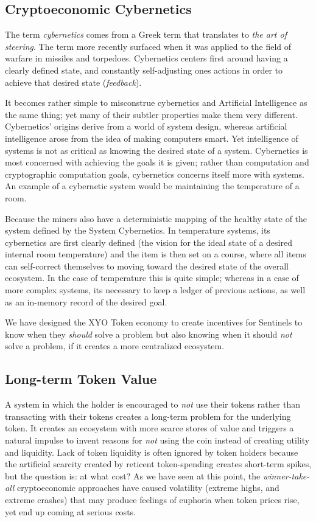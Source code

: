 \documentclass{article}
\begin{document}
\subsection{Cryptoeconomic Cybernetics}
The term \textit{cybernetics} comes from a Greek term that translates to \textit{the art of steering}. The term more recently surfaced when it was applied to the field of warfare in missiles and torpedoes. Cybernetics centers first around having a clearly defined {state}, and constantly self-adjusting ones actions in order to achieve that desired state (\textit{feedback}).

It becomes rather simple to misconstrue cybernetics and Artificial Intelligence as the same thing; yet many of their subtler properties make them very different. Cybernetics' origins derive from a world of system design, whereas artificial intelligence arose from the idea of making computers smart. Yet intelligence of systems is not as critical as knowing the desired state of a system. Cybernetics is most concerned with achieving the goals it is given; rather than computation and cryptographic computation goals, cybernetics concerns itself more with systems. An example of a cybernetic system would be maintaining the temperature of a room. 

Because the miners also have a deterministic mapping of the healthy state of the system defined by the System Cybernetics. In temperature systems, its cybernetics are first clearly defined (the vision for the ideal state of a desired internal room temperature) and the item is then set on a course, where all items can self-correct themselves to moving toward the desired state of the overall ecosystem. In the case of temperature this is quite simple; whereas in a case of more complex systems, its necessary to keep a ledger of previous actions, as well as an in-memory record of the desired goal. 

We have designed the XYO Token economy to create incentives for Sentinels to know when they \textit{should} solve a problem but also knowing when it should \textit{not} solve a problem, if it creates a more centralized ecosystem. 

\subsection{Long-term Token Value}
A system in which the holder is encouraged to \textit{not} use their tokens rather than transacting with their tokens creates a long-term problem for the underlying token.  It creates an ecosystem with more scarce stores of value and triggers a natural impulse to invent reasons for \textit{not} using the coin instead of creating utility and liquidity. Lack of token liquidity is often ignored by token holders because the artificial scarcity created by reticent token-spending creates short-term spikes, but the question is: at what cost? As we have seen at this point, the \textit{winner-take-all} cryptoeconomic approaches have caused volatility (extreme highs, and extreme crashes) that may produce feelings of euphoria when token prices rise, yet end up coming at serious costs. 
\end{document}
